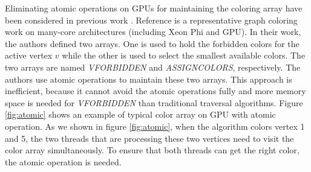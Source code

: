 Eliminating atomic operations on GPUs for maintaining 
the coloring array have been considered in previous work 
\cite{vldbcolor,Manycore}. Reference \cite{Manycore} 
is a representative graph coloring work on many-core architectures 
(including Xeon Phi and GPU). In their work, the authors defined two 
arrays. One is used to hold the forbidden colors for the active 
vertex $v$ while the other is used to select the smallest available 
colors. The two arrays are named \emph{VFORBIDDEN} and \emph{ASSIGNCOLORS}, respectively. 
The authors use atomic operations to maintain these two arrays. 
This approach is inefficient, because it cannot avoid the atomic 
operations fully and more memory space is needed for \emph{VFORBIDDEN} than 
traditional traversal algorithms. Figure \ref{fig:atomic} shows 
an example of typical color array on GPU with atomic operation. 
As we shown in figure \ref{fig:atomic}, when the algorithm colors 
vertex 1 and 5, the two threads that are processing these two vertices 
need to visit the color array simultaneously. To ensure that
both threads can get the right color, the atomic operation is needed. 

